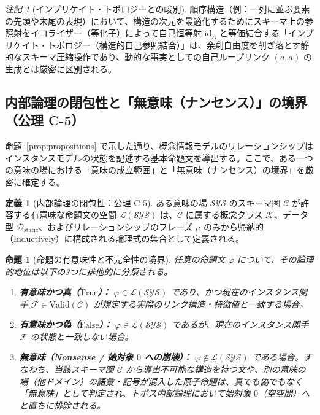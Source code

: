\documentclass[11pt,a4paper]{ltjsarticle}
\theoremstyle{definition}
\newtheorem{definition}{定義}[section]
\theoremstyle{plain}
\newtheorem{proposition}{命題}[section]
\theoremstyle{remark}
\newtheorem{remark}{注記}[section]
\newcommand{\Valid}{\mathrm{Valid}}
\newcommand{\id}{\mathrm{id}}
\newcommand{\Dstatic}{\mathcal{D}_{\mathrm{static}}}
\begin{document}
\begin{remark}[インプリケイト・トポロジーとの峻別]
順序構造（例：一列に並ぶ要素の先頭や末尾の表現）において、構造の次元を最適化するためにスキーマ上の参照射をイコライザー（等化子）によって自己恒等射 $\id_A$ と等価結合する「インプリケイト・トポロジー（構造的自己参照結合）」は、余剰自由度を削ぎ落とす静的なスキーマ圧縮操作であり、動的な事実としての自己ループリンク $(a, a)$ の生成とは厳密に区別される。
\end{remark}

\subsection{内部論理の閉包性と「無意味（ナンセンス）」の境界（公理 C-5）}
命題~\ref{prop:propositions} で示した通り、概念情報モデルのリレーションシップはインスタンスモデルの状態を記述する基本命題文を導出する。ここで、ある一つの意味の場における「意味の成立範囲」と「無意味（ナンセンス）の境界」を厳密に確定する。

\begin{definition}[内部論理の閉包性：公理 C-5]\label{def:logic-closure}
ある意味の場 $\mathcal{SYS}$ のスキーマ圏 $\mathcal{C}$ が許容する有意味な命題文の空間 $\mathcal{L}(\mathcal{SYS})$ は、$\mathcal{C}$ に属する概念クラス $\mathcal{K}$、データ型 $\Dstatic$、およびリレーションシップのフレーズ $\mu$ のみから帰納的（Inductively）に構成される論理式の集合として定義される。
\end{definition}

\begin{proposition}[命題の有意味性と不完全性の境界]\label{prop:trichotomy}
任意の命題文 $\varphi$ について、その論理的地位は以下の3つに排他的に分類される。
\begin{enumerate}
    \item \textbf{有意味かつ真（$\mathrm{True}$）：} $\varphi \in \mathcal{L}(\mathcal{SYS})$ であり、かつ現在のインスタンス関手 $\mathcal{F} \in \Valid(\mathcal{C})$ が規定する実際のリンク構造・特徴値と一致する場合。
    \item \textbf{有意味かつ偽（$\mathrm{False}$）：} $\varphi \in \mathcal{L}(\mathcal{SYS})$ であるが、現在のインスタンス関手 $\mathcal{F}$ の状態と一致しない場合。
    \item \textbf{無意味（Nonsense / 始対象 $0$ への崩壊）：} $\varphi \notin \mathcal{L}(\mathcal{SYS})$ である場合。すなわち、当該スキーマ圏 $\mathcal{C}$ から導出不可能な構造を持つ文や、別の意味の場（他ドメイン）の語彙・記号が混入した原子命題は、真でも偽でもなく「無意味」として判定され、トポス内部論理において始対象 $0$（空空間）へと直ちに排除される。
\end{enumerate}
\end{proposition}
\end{document}
